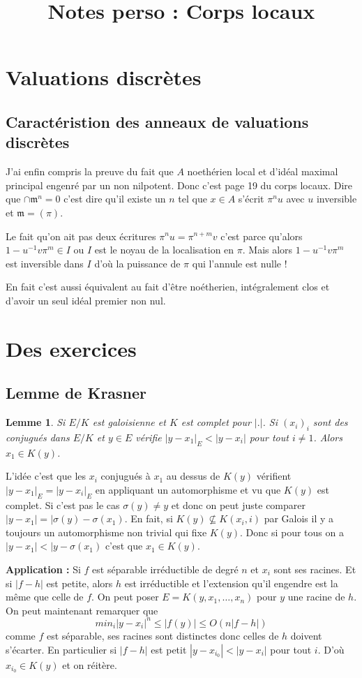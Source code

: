\documentclass[a4paper,12pt]{book}
\title{Notes perso : Corps locaux}
\date{}
\newcommand{\m}{\mathfrak{m}}
\theoremstyle{plain}
\newtheorem{lem}[subsection]{Lemme}
\theoremstyle{definition}
\theoremstyle{remark}
\begin{document}
\maketitle
\tableofcontents

\chapter*{Valuations discrètes}
\section*{Caractéristion des anneaux de valuations discrètes}
J'ai enfin compris la preuve du fait que $A$ noethérien local et d'idéal 
maximal principal engenré par un non nilpotent. Donc c'est page 19
du corps locaux. Dire que $\cap \m^n=0$ c'est dire qu'il existe un 
$n$ tel que $x\in A$ s'écrit $\pi^n u$ avec $u$ inversible et $\m=(\pi)$.

Le fait qu'on ait pas deux écritures $\pi^n u=\pi^{n+m} v$ c'est parce
qu'alors $1-u^{-1}v\pi^m\in I$ ou $I$ est le noyau de la localisation
en $\pi$. Mais alors $1-u^{-1}v\pi^m$ est inversible dans $I$ d'où
la puissance de $\pi$ qui l'annule est nulle !


En fait c'est aussi équivalent au fait d'être noétherien, intégralement
clos et d'avoir un seul idéal premier non nul.

\chapter*{Des exercices}
\section*{Lemme de Krasner}
\begin{lem}
  Si $E/K$ est galoisienne et $K$ est complet pour $|.|$. Si 
  $(x_i)_i$ sont des conjugués dans $E/K$ et $y\in E$ vérifie
  $|y-x_1|_E<|y-x_i|$ pour tout $i\ne 1$. Alors $x_1\in K(y)$.
\end{lem}
L'idée c'est que les $x_i$ conjugués à $x_1$ au dessus de $K(y)$
vérifient $|y-x_1|_E=|y-x_i|_E$ en appliquant un automorphisme 
et vu que $K(y)$ est complet. Si c'est pas le cas 
$\sigma(y)\ne y$ et donc on peut juste comparer 
$|y-x_1|=|\sigma(y)-\sigma(x_1)$. En fait, si $K(y)\nsubseteq K(x_i,i)$
par Galois il y a toujours un automorphisme non trivial qui fixe 
$K(y)$. Donc si pour tous on a $|y-x_1|<|y-\sigma(x_1)$ c'est que
$x_1\in K(y)$.

\textbf{Application :}
Si $f$ est séparable irréductible de degré $n$ et $x_i$ sont 
ses racines. Et si $|f-h|$ est petite, alors $h$ est irréductible
et l'extension qu'il engendre est la même que celle de $f$.
On peut poser $E=K(y,x_1,\ldots,x_n)$ pour $y$ une racine 
de $h$. On peut maintenant remarquer que 
\[min_i|y-x_i|^n\leq |f(y)|\leq O(n|f-h|)\] 
comme $f$ est séparable, ses racines sont distinctes donc
celles de $h$ doivent s'écarter. En particulier si $|f-h|$ 
est petit $|y-x_{i_0}|<|y-x_i|$ pour tout $i$. D'où 
$x_{i_0}\in K(y)$ et on réitère.



\printbibliography
\end{document}
